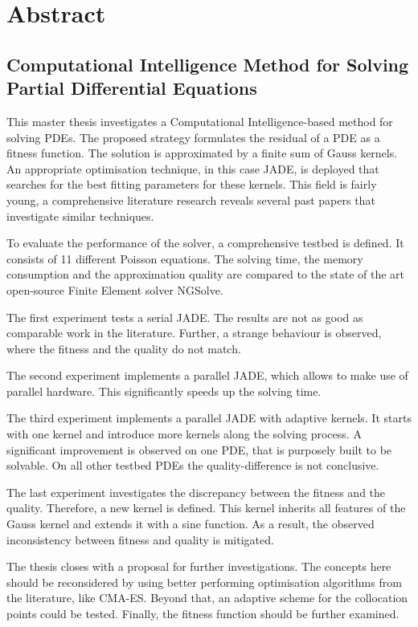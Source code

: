 \documentclass[./\jobname.tex]{subfiles}
\begin{document}
\chapter*{Abstract}
\section*{Computational Intelligence Method for Solving Partial Differential Equations}
%
This master thesis investigates a Computational Intelligence-based method for solving PDEs. The proposed strategy formulates the residual of a PDE as a fitness function. The solution is approximated by a finite sum of Gauss kernels. An appropriate optimisation technique, in this case JADE, is deployed that searches for the best fitting parameters for these kernels. This field is fairly young, a comprehensive literature research reveals several past papers that investigate similar techniques.

To evaluate the performance of the solver, a comprehensive testbed is defined. It consists of 11 different Poisson equations. The solving time, the memory consumption and the approximation quality are compared to the state of the art open-source Finite Element solver NGSolve. 

The first experiment tests a serial JADE. The results are not as good as comparable work in the literature. Further, a strange behaviour is observed, where the fitness and the quality do not match. 

The second experiment implements a parallel JADE, which allows to make use of parallel hardware. This significantly speeds up the solving time.

The third experiment implements a parallel JADE with adaptive kernels. It starts with one kernel and introduce more kernels along the solving process. A significant improvement is observed on one PDE, that is purposely built to be solvable. On all other testbed PDEs the quality-difference is not conclusive. 

The last experiment investigates the discrepancy between the fitness and the quality. Therefore, a new kernel is defined. This kernel inherits all features of the Gauss kernel and extends it with a sine function. As a result, the observed inconsistency between fitness and quality is mitigated. 

The thesis closes with a proposal for further investigations. The concepts here should be reconsidered by using better performing optimisation algorithms from the literature, like CMA-ES. Beyond that, an adaptive scheme for the collocation points could be tested. Finally, the fitness function should be further examined.
%
\end{document}
